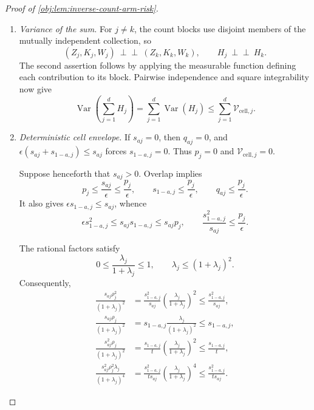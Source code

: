 \begin{proof}[Proof of \cref{obj:lem:inverse-count-arm-risk}]
\begin{enumerate}
\item \emph{Variance of the sum.}
For \(j\ne k\), the count blocks use disjoint members of the mutually
independent collection, so
\[
(Z_j,K_j,W_j)\ \perp\!\!\!\perp\ (Z_k,K_k,W_k),
\qquad
H_j\ \perp\!\!\!\perp\ H_k.
\]
The second assertion follows by applying the measurable function defining
each contribution to its block. Pairwise independence and square
integrability now give
\[
\operatorname{Var}\!\left(\sum_{j=1}^{d}H_j\right)
=\sum_{j=1}^{d}\operatorname{Var}(H_j)
\le\sum_{j=1}^{d}\mathcal V_{\mathrm{cell},j}.
\]

\item \emph{Deterministic cell envelope.}
If \(s_{aj}=0\), then \(q_{aj}=0\), and
\(\epsilon(s_{aj}+s_{1-a,j})\le s_{aj}\) forces
\(s_{1-a,j}=0\). Thus \(p_j=0\) and
\(\mathcal V_{\mathrm{cell},j}=0\).

Suppose henceforth that \(s_{aj}>0\). Overlap implies
\[
p_j\le\frac{s_{aj}}\epsilon\le\frac{p_j}\epsilon,
\qquad
s_{1-a,j}\le\frac{p_j}\epsilon,
\qquad
q_{aj}\le\frac{p_j}\epsilon.
\]
It also gives \(\epsilon s_{1-a,j}\le s_{aj}\), whence
\[
\epsilon s_{1-a,j}^2
\le s_{aj}s_{1-a,j}
\le s_{aj}p_j,
\qquad
\frac{s_{1-a,j}^2}{s_{aj}}\le\frac{p_j}\epsilon.
\]

The rational factors satisfy
\[
0\le\frac{\lambda_j}{1+\lambda_j}\le1,
\qquad
\lambda_j\le(1+\lambda_j)^2.
\]
Consequently,
\[
\begin{aligned}
\frac{s_{aj}\rho_j^2}{(1+\lambda_j)^2}
&=\frac{s_{1-a,j}^2}{s_{aj}}
  \left(\frac{\lambda_j}{1+\lambda_j}\right)^2
\le\frac{s_{1-a,j}^2}{s_{aj}},\\
\frac{s_{aj}\rho_j}{(1+\lambda_j)^2}
&=s_{1-a,j}\frac{\lambda_j}{(1+\lambda_j)^2}
\le s_{1-a,j},\\
\frac{s_{aj}^2\rho_j}{(1+\lambda_j)^2}
&=\frac{s_{1-a,j}}t
  \left(\frac{\lambda_j}{1+\lambda_j}\right)^2
\le\frac{s_{1-a,j}}t,\\
\frac{s_{aj}^2\rho_j^2\lambda_j}{(1+\lambda_j)^4}
&=\frac{s_{1-a,j}^2}{t s_{aj}}
  \left(\frac{\lambda_j}{1+\lambda_j}\right)^4
\le\frac{s_{1-a,j}^2}{t s_{aj}}.
\end{aligned}
\]


\end{enumerate}
\end{proof}
